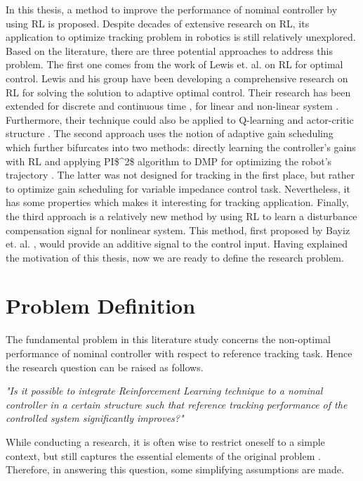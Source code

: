 In this thesis, a method to improve the performance of nominal controller by using \ac{RL} is proposed. Despite decades of extensive research on \ac{RL}, its application to optimize tracking problem in robotics is still relatively unexplored. Based on the literature, there are three potential approaches to address this problem. The first one comes from the work of Lewis et. al. on \ac{RL} for optimal control. Lewis and his group have been developing a comprehensive research on \ac{RL} for solving the solution to adaptive optimal control. Their research has been extended for discrete \cite{Kiumarsi20141167} and continuous time \cite{Modares6760477}, for linear \cite{Kiumarsi6760476} and non-linear system \cite{Kiumarsi6918527}. Furthermore, their technique could also be applied to Q-learning \cite{Kiumarsi20141167} and actor-critic structure \cite{Kiumarsi6918527}. The second approach uses the notion of adaptive gain scheduling which further bifurcates into two methods: directly learning the controller's gains with \ac {RL} \cite{Brujeni5669655} and applying \ac{PI$^2$} algorithm to \ac {DMP} for optimizing the robot's trajectory \cite{Buchli2010} \cite{Buchli6037312} . The latter was not designed for tracking in the first place, but rather to optimize gain scheduling for variable impedance control task. Nevertheless, it has some properties which makes it interesting for tracking application. Finally, the third approach is a relatively new method by using \ac{RL} to learn a disturbance compensation signal for nonlinear system. This method, first proposed by Bayiz et. al. \cite{Efe2014}, would provide an additive signal to the control input. Having explained the motivation of this thesis, now we are ready to define the research problem.



\section{Problem Definition}
The fundamental problem in this literature study concerns the non-optimal performance of nominal controller with respect to reference tracking task. Hence the research question can be raised as follows.

\textit{"Is it possible to integrate Reinforcement Learning technique to a nominal controller in a certain structure such that reference tracking performance of the controlled system significantly improves?"}

While conducting a research, it is often wise to restrict oneself to a simple context, but still captures the essential elements of the original problem \cite{einstein}. Therefore, in answering this question, some simplifying assumptions are made.

